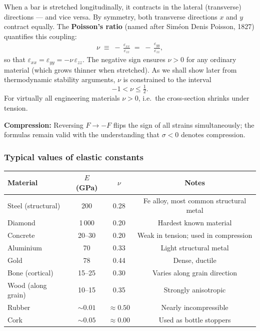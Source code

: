 When a bar is stretched longitudinally, it contracts in the lateral
(transverse) directions — and vice versa.  By symmetry, both transverse
directions $x$ and $y$ contract equally.  The \textbf{Poisson's ratio}
(named after Siméon Denis Poisson, 1827) quantifies this coupling:
\begin{align}
    \nu \;\equiv\; -\,\frac{\varepsilon_{xx}}{\varepsilon_{zz}}
         \;=\;      -\,\frac{\varepsilon_{yy}}{\varepsilon_{zz}},
    \label{eq:lec02:poisson_def}
\end{align}
so that $\varepsilon_{xx} = \varepsilon_{yy} = -\nu\,\varepsilon_{zz}$.
The negative sign ensures $\nu > 0$ for any ordinary material (which
grows thinner when stretched).  As we shall show later from thermodynamic
stability arguments, $\nu$ is constrained to the interval
\[
    -1 < \nu \leq \tfrac{1}{2}.
\]
For virtually all engineering materials $\nu > 0$, i.e.\ the cross-section
shrinks under tension.

\noindent\textbf{Compression:} Reversing $F \to -F$ flips the sign of
all strains simultaneously; the formulas remain valid with the
understanding that $\sigma < 0$ denotes compression.

\subsubsection*{Typical values of elastic constants}

\begin{center}
\begin{tabular}{lccc}
\hline
\textbf{Material} & \textbf{$E$ (GPa)} & \textbf{$\nu$} & \textbf{Notes}\\
\hline
Steel (structural)  & 200     & 0.28 & Fe alloy, most common structural metal\\
Diamond             & 1\,000  & 0.20 & Hardest known material\\
Concrete            & 20--30  & 0.20 & Weak in tension; used in compression\\
Aluminium           & 70      & 0.33 & Light structural metal\\
Gold                & 78      & 0.44 & Dense, ductile\\
Bone (cortical)     & 15--25  & 0.30 & Varies along grain direction\\
Wood (along grain)  & 10--15  & 0.35 & Strongly anisotropic\\
Rubber              & $\sim 0.01$ & $\approx 0.50$ & Nearly incompressible\\
Cork                & $\sim 0.05$ & $\approx 0.00$ & Used as bottle stoppers\\
\hline
\end{tabular}
\end{center}

